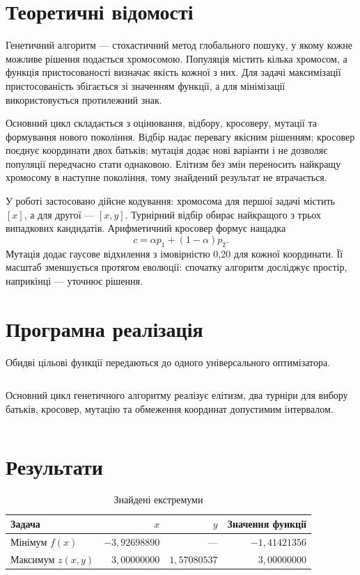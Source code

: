 \documentclass[12pt,a4paper]{article}
\begin{document}
\section{Теоретичні відомості}
Генетичний алгоритм --- стохастичний метод глобального пошуку, у якому кожне можливе рішення подається хромосомою. Популяція містить кілька хромосом, а функція пристосованості визначає якість кожної з них. Для задачі максимізації пристосованість збігається зі значенням функції, а для мінімізації використовується протилежний знак.

Основний цикл складається з оцінювання, відбору, кросоверу, мутації та формування нового покоління. Відбір надає перевагу якісним рішенням; кросовер поєднує координати двох батьків; мутація додає нові варіанти і не дозволяє популяції передчасно стати однаковою. Елітизм без змін переносить найкращу хромосому в наступне покоління, тому знайдений результат не втрачається.

У роботі застосовано дійсне кодування: хромосома для першої задачі містить $[x]$, а для другої --- $[x,y]$. Турнірний відбір обирає найкращого з трьох випадкових кандидатів. Арифметичний кросовер формує нащадка
\begin{equation}c=\alpha p_1+(1-\alpha)p_2.\end{equation}
Мутація додає гаусове відхилення з імовірністю 0,20 для кожної координати. Її масштаб зменшується протягом еволюції: спочатку алгоритм досліджує простір, наприкінці --- уточнює рішення.

\section{Програмна реалізація}
Обидві цільові функції передаються до одного універсального оптимізатора.
\begin{listing}[H]
\inputminted[firstline=18,lastline=25]{python}{../src/main.py}
\caption{Функції варіанта 6}
\end{listing}

Основний цикл генетичного алгоритму реалізує елітизм, два турніри для вибору батьків, кросовер, мутацію та обмеження координат допустимим інтервалом.
\begin{listing}[H]
\inputminted[firstline=28,lastline=64]{python}{../src/main.py}
\caption{Універсальний генетичний алгоритм}
\end{listing}

\section{Результати}
\begin{table}[H]\centering
\begin{tabular}{lrrr}\toprule Задача & $x$ & $y$ & Значення функції\\\midrule
Мінімум $f(x)$ & $-3{,}92698890$ & --- & $-1{,}41421356$\\
Максимум $z(x,y)$ & $3{,}00000000$ & $1{,}57080537$ & $3{,}00000000$\\\bottomrule
\end{tabular}\caption{Знайдені екстремуми}\end{table}
\end{document}
